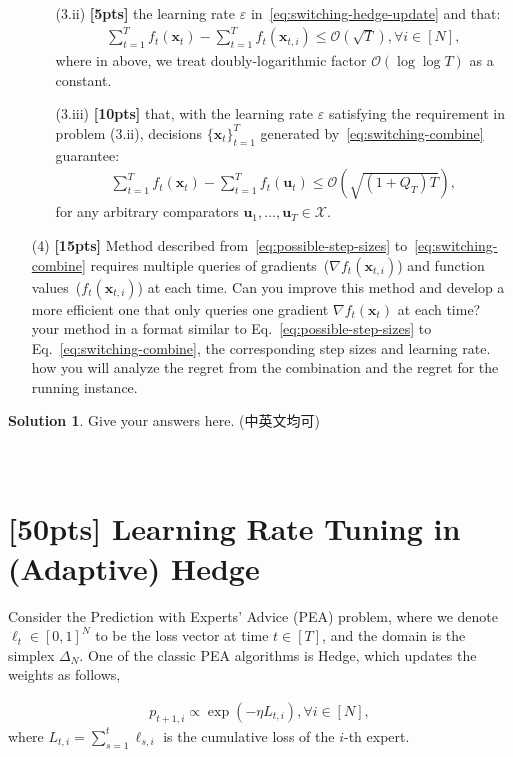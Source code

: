 \documentclass[a4paper]{article}
\numberwithin{equation}{section}
\theoremstyle{definition}
\newtheorem*{solution}{Solution}
\theoremstyle{definition}
\def \X {\mathcal{X}}
\def \O {\mathcal{O}}
\def \u {\textbf{u}}
\def \x {\textbf{x}}
\let\epsilon\varepsilon
\begin{document}
\begin{enumerate}
\begin{enumerate}
    \item[(3.ii)] \textbf{[5pts]}  the learning rate $\epsilon$ in~\eqref{eq:switching-hedge-update} and  that:
    \begin{align*}
      \sum_{t=1}^T f_t(\x_t) - \sum_{t=1}^T f_t(\x_{t,i}) \leq \O\left(\sqrt{T}\right), \forall i \in [N],
    \end{align*}
    where in above, we treat doubly-logarithmic factor $\O(\log\log T)$ as a constant.
    \item[(3.iii)] \textbf{[10pts]}  that, with the learning rate $\epsilon$ satisfying the requirement in problem (3.ii), decisions $\{\x_t\}_{t=1}^T$ generated by~\eqref{eq:switching-combine} guarantee:
    \begin{align*}
      \sum_{t=1}^T f_t(\x_t) - \sum_{t=1}^T f_t(\u_t) \leq \O\left(\sqrt{(1+Q_T)T}\right),
    \end{align*}
    for any arbitrary comparators $\u_1, \dots, \u_T \in \X$.
  \end{enumerate}
  \item[(4)] \textbf{[15pts]} Method described from~\eqref{eq:possible-step-sizes} to~\eqref{eq:switching-combine} requires multiple queries of gradients~($\nabla f_t(\x_{t,i})$) and function values~($f_t(\x_{t,i})$) at each time. Can you improve this method and develop a more efficient one that only queries one gradient $\nabla f_t(\x_t)$ at each time? 
   your method in a format similar to Eq.~\eqref{eq:possible-step-sizes} to Eq.~\eqref{eq:switching-combine},  the corresponding step sizes and learning rate.  how you will analyze the regret from the combination and the regret for the running instance.
\end{enumerate}

\begin{solution}
Give your answers here. (中英文均可)
~\\
~\\
~\\
\end{solution}




\newpage
\section{[50pts] Learning Rate Tuning in (Adaptive) Hedge}
\label{sec:PEA}
Consider the Prediction with Experts' Advice (PEA) problem, where we denote $\boldsymbol{\ell}_{t}\in[0, 1]^N$ to be the loss vector at time $t\in[T]$, and the domain is the simplex $\Delta_N$. One of the classic PEA algorithms is Hedge, which updates the weights as follows,
\begin{tcolorbox}[top=-8pt]
  \begin{align}
    \label{eq:Hedge-formula}
    p_{t+1, i} \propto \exp(-\eta L_{t, i}), \forall i \in [N],   
  \end{align}
  where $L_{t, i}=\sum_{s=1}^t \ell_{s, i}$ is the cumulative loss of the $i$-th expert. 
\end{tcolorbox}
\end{document}
